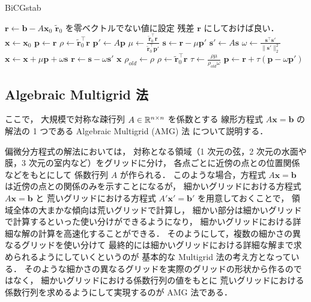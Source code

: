 \begin{algorithm}[tp]
    \caption{BiCGstab \cite{Golub2013}}
    \label{alg:matrix-computation__bicgstab}
    \begin{algorithmic}
        \State $\bm{r} \gets \bm{b} - A \bm{x}_0$
        \State $\tilde{\bm{r}}_0$ を零ベクトルでない値に設定
        \Comment 残差 $\bm{r}$ にしておけば良い．
        \State $\bm{x} \gets \bm{x}_0$
        \State $\bm{p} \gets \bm{r}$
        \State $\rho \gets \tilde{\bm{r}}_0^\top \bm{r}$
        \Loop
        \State $\bm{p}' \gets A \bm{p}$
        \State $\mu \gets \frac{\tilde{\bm{r}}_0^\top \bm{r}}{\tilde{\bm{r}}_0^\top \bm{p}'}$
        \State $\bm{s} \gets \bm{r} - \mu \bm{p}'$
        \State $\bm{s}' \gets A \bm{s}$
        \State $\omega \gets \frac{\bm{s}^\top \bm{s}'}{\|\bm{s}'\|_2^2}$
        \State $\bm{x} \gets \bm{x} + \mu \bm{p} + \omega \bm{s}$
        \State $\bm{r} \gets \bm{s} - \omega \bm{s}'$
        \State \Return $\bm{x}$
        \EndIf
        \State $\rho_{old} \gets \rho$
        \State $\rho \gets \tilde{\bm{r}}_0^\top \bm{r}$
        \State $\tau \gets \frac{\rho \mu}{\rho_{old} \omega}$
        \State $\bm{p} \gets \bm{r} + \tau(\bm{p} - \omega \bm{p}')$
        \EndLoop
        \EndProcedure
    \end{algorithmic}
\end{algorithm}

\subsection{Algebraic Multigrid 法}


ここで，
大規模で対称な疎行列 $A \in \mathbb{R}^{n \times n}$ を係数とする
線形方程式 $A \bm{x} = \bm{b}$ の解法の 1 つである
Algebraic Multigrid (AMG) 法
\cite{Ruge1987}
について説明する．

偏微分方程式の解法においては，
対称となる領域（1 次元の弦，2 次元の水面や膜，3 次元の室内など）をグリッドに分け，
各点ごとに近傍の点との位置関係などをもとにして
係数行列 $A$ が作られる．
このような場合，方程式 $A \bm{x} = \bm{b}$ は近傍の点との関係のみを示すことになるが，
細かいグリッドにおける方程式 $A \bm{x} = \bm{b}$ と
荒いグリッドにおける方程式 $A' \bm{x}' = \bm{b}'$ を用意しておくことで，
領域全体の大まかな傾向は荒いグリッドで計算し，
細かい部分は細かいグリッドで計算するといった使い分けができるようになり，
細かいグリッドにおける詳細な解の計算を高速化することができる．
そのようにして，複数の細かさの異なるグリッドを使い分けて
最終的には細かいグリッドにおける詳細な解まで求められるようにしていくというのが
基本的な Multigrid 法の考え方となっている．
そのような細かさの異なるグリッドを実際のグリッドの形状から作るのではなく，
細かいグリッドにおける係数行列の値をもとに
荒いグリッドにおける係数行列を求めるようにして実現するのが
AMG 法である．

